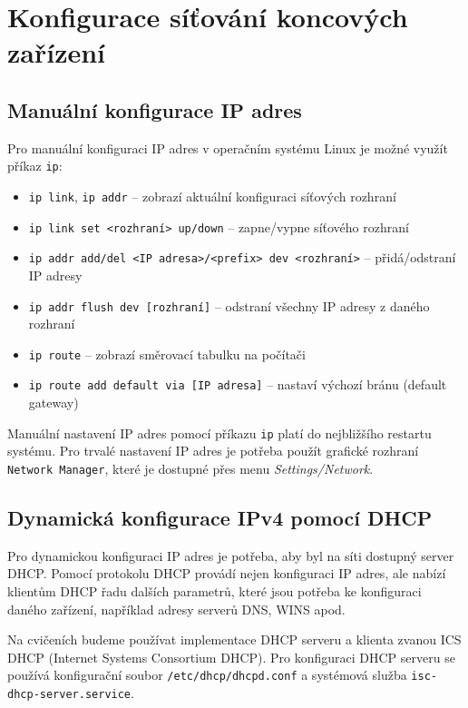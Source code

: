 \section{Konfigurace síťování koncových zařízení}
\label{ipconfig}

\subsection{Manuální konfigurace IP adres}\label{ip_manual}
Pro manuální konfiguraci IP adres v operačním systému Linux je možné využít příkaz {\tt ip}:
\begin{itemize}
  \item \verb_ip link_, \verb_ip addr_ -- zobrazí aktuální konfiguraci síťových rozhraní
  \item \verb_ip link set <rozhraní> up/down_ -- zapne/vypne síťového rozhraní
  \item \verb_ip addr add/del <IP adresa>/<prefix> dev <rozhraní>_ -- přidá/odstraní IP adresy 
  \item \verb_ip addr flush dev [rozhraní]_ -- odstraní všechny IP adresy z daného rozhraní
  \item \verb_ip route_ -- zobrazí směrovací tabulku na počítači
  \item \verb_ip route add default via [IP adresa]_ -- nastaví výchozí bránu (default gateway)
\end{itemize}

Manuální nastavení IP adres pomocí příkazu {\tt ip} platí do nejbližšího restartu systému. Pro trvalé nastavení IP adres je potřeba použít grafické rozhraní {\tt Network Manager}, které je dostupné přes menu \textit{Settings/Network}.

\subsection{Dynamická konfigurace IPv4 pomocí DHCP}\label{dhcp}
Pro dynamickou konfiguraci IP adres je potřeba, aby byl na síti dostupný server DHCP. Pomocí protokolu DHCP provádí nejen konfiguraci IP adres, ale  nabízí klientům DHCP řadu dalších parametrů, které jsou potřeba ke konfiguraci daného zařízení, například adresy serverů DNS, WINS apod. 

Na cvičeních budeme používat implementace DHCP serveru a klienta zvanou ICS DHCP (Internet Systems Consortium DHCP). Pro konfiguraci DHCP serveru se používá konfigurační soubor \verb_/etc/dhcp/dhcpd.conf_ a systémová služba \texttt{isc-dhcp-server.service}.

